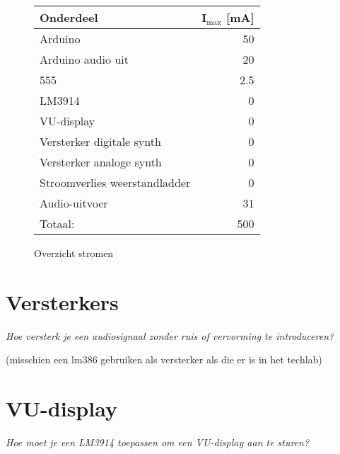 \documentclass[12pt, a4paper, dutch]{article}
\newcommand{\sub}[1]{$_{\text{#1}}$}
\begin{document}
\begin{figure}[H]
\centering
\begin{tabular}{lr}
\toprule
Onderdeel & I\sub{max} [\si{\milli\ampere}]\\
\midrule
Arduino & \num{50} \\
Arduino audio uit & \num{20} \\
555 & \num{2.5} \\
LM3914 & \num{0} \\
VU-display & \num{0} \\
Versterker digitale synth & \num{0} \\
Versterker analoge synth & \num{0} \\
Stroomverlies weerstandladder & \num{0} \\
Audio-uitvoer & \num{31} \\
\midrule
\hfill Totaal: & \num{500} \\
\bottomrule
\end{tabular}
\caption{Overzicht stromen}
\end{figure}

\section{Versterkers}

\textit{Hoe versterk je een audiosignaal zonder ruis of vervorming te introduceren?}

(misschien een lm386 gebruiken als versterker als die er is in het techlab)

\section{VU-display}

\textit{Hoe moet je een LM3914 toepassen om een VU-display aan te sturen?}
\end{document}
